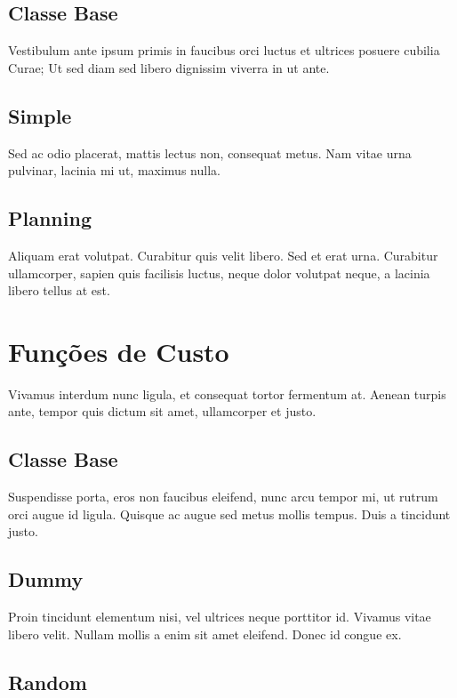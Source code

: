 \subsection{Classe Base}

Vestibulum ante ipsum primis in faucibus orci luctus et ultrices posuere cubilia
Curae; Ut sed diam sed libero dignissim viverra in ut ante.

\subsection{Simple}

Sed ac odio placerat, mattis lectus non, consequat metus. Nam vitae urna
pulvinar, lacinia mi ut, maximus nulla.

\subsection{Planning}

Aliquam erat volutpat. Curabitur quis velit libero.
Sed et erat urna. Curabitur ullamcorper, sapien quis facilisis luctus, neque
dolor volutpat neque, a lacinia libero tellus at est.

\section{Funções de Custo}

Vivamus interdum nunc ligula, et consequat tortor fermentum at. Aenean turpis
ante, tempor quis dictum sit amet, ullamcorper et justo.

\subsection{Classe Base}

Suspendisse porta, eros non faucibus eleifend, nunc arcu tempor mi, ut rutrum
orci augue id ligula. Quisque ac augue sed metus mollis tempus. Duis a tincidunt
justo.

\subsection{Dummy}

Proin tincidunt elementum nisi, vel ultrices neque porttitor id. Vivamus vitae
libero velit. Nullam mollis a enim sit amet eleifend. Donec id congue ex.

\subsection{Random}

